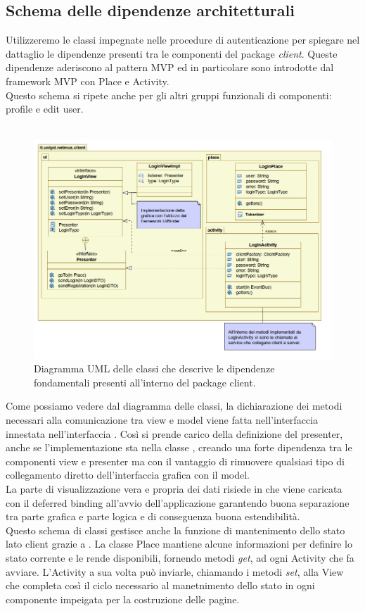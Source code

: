 \subsection*{Schema delle dipendenze architetturali}
Utilizzeremo le classi impegnate nelle procedure di autenticazione per spiegare
nel dattaglio le dipendenze presenti tra le componenti del package
\emph{client}. 
Queste dipendenze aderiscono al pattern MVP ed in particolare sono introdotte
dal framework MVP con Place e Activity.\\
Questo schema si ripete anche per gli altri gruppi funzionali di componenti:
profile e edit user.\\\\
\begin{figure}[h]
  \centering
  \includegraphics[width=16cm]{img/DP/package.png}
\caption{Diagramma UML delle classi che descrive le dipendenze
fondamentali presenti all'interno del package client.}
\end{figure}
Come possiamo vedere dal diagramma delle classi, la dichiarazione dei metodi
necessari alla comunicazione tra view e model viene fatta nell'interfaccia 
 innestata nell'interfaccia . Cos\`i 
si prende carico della definizione del presenter, anche se l'implementazione sta
nella classe , creando una forte dipendenza tra le componenti view e
presenter ma con il vantaggio di rimuovere qualsiasi tipo di collegamento
diretto dell'interfaccia grafica con il model.\\
La parte di visualizzazione vera e propria dei dati risiede in
 che viene caricata con il deferred binding all'avvio
dell'applicazione garantendo buona separazione tra parte grafica e parte logica
e di conseguenza buona estendibilit\`a.\\
Questo schema di classi gestisce
anche la funzione di mantenimento dello stato lato client grazie a
. La classe Place mantiene alcune informazioni per definire lo
stato corrente e le rende disponibili, fornendo metodi \emph{get}, ad ogni
Activity che fa avviare. L'Activity a sua volta pu\`o inviarle, chiamando i
metodi \emph{set}, alla View che completa cos\`i il ciclo necessario al
manetnimento dello stato in ogni componente impeigata per la costruzione delle pagine.

